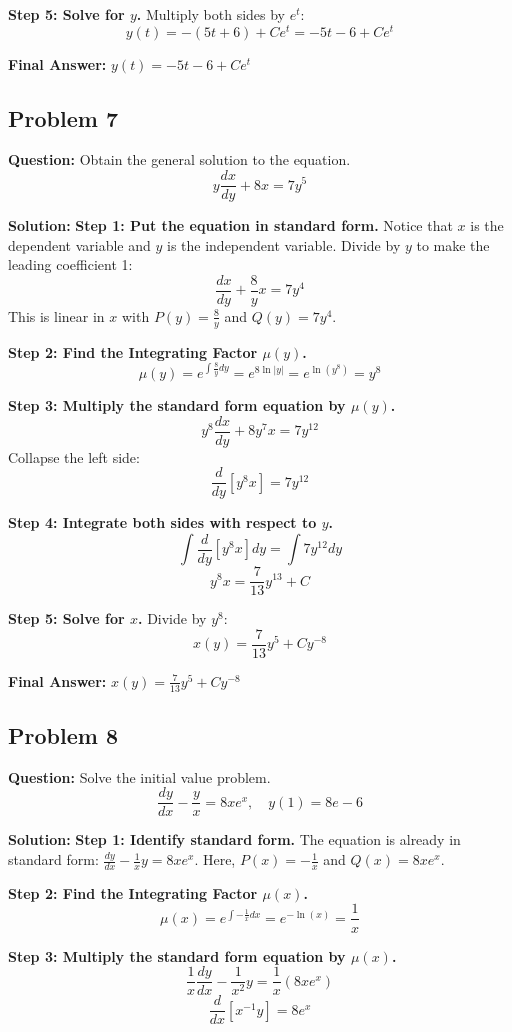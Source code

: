 \documentclass[11pt]{article}
\begin{document}
\textbf{Step 5: Solve for $y$.}
Multiply both sides by $e^t$:
\[ y(t) = - (5t + 6) + Ce^t = -5t - 6 + Ce^t \]

\textbf{Final Answer:} $y(t) = -5t - 6 + Ce^t$

\hrulefill

\subsection*{Problem 7}
\textbf{Question:} Obtain the general solution to the equation.
\[ y \frac{dx}{dy} + 8x = 7y^5 \]

\textbf{Solution:}
\textbf{Step 1: Put the equation in standard form.}
Notice that $x$ is the dependent variable and $y$ is the independent variable. Divide by $y$ to make the leading coefficient 1:
\[ \frac{dx}{dy} + \frac{8}{y} x = 7y^4 \]
This is linear in $x$ with $P(y) = \frac{8}{y}$ and $Q(y) = 7y^4$.

\textbf{Step 2: Find the Integrating Factor $\mu(y)$.}
\[ \mu(y) = e^{\int \frac{8}{y} dy} = e^{8\ln|y|} = e^{\ln(y^8)} = y^8 \]

\textbf{Step 3: Multiply the standard form equation by $\mu(y)$.}
\[ y^8 \frac{dx}{dy} + 8y^7 x = 7y^{12} \]
Collapse the left side:
\[ \frac{d}{dy} \left[ y^8 x \right] = 7y^{12} \]

\textbf{Step 4: Integrate both sides with respect to $y$.}
\[ \int \frac{d}{dy} \left[ y^8 x \right] dy = \int 7y^{12} dy \]
\[ y^8 x = \frac{7}{13}y^{13} + C \]

\textbf{Step 5: Solve for $x$.}
Divide by $y^8$:
\[ x(y) = \frac{7}{13}y^5 + Cy^{-8} \]

\textbf{Final Answer:} $x(y) = \frac{7}{13}y^5 + Cy^{-8}$

\hrulefill

\subsection*{Problem 8}
\textbf{Question:} Solve the initial value problem.
\[ \frac{dy}{dx} - \frac{y}{x} = 8xe^x, \quad y(1) = 8e - 6 \]

\textbf{Solution:}
\textbf{Step 1: Identify standard form.}
The equation is already in standard form: $\frac{dy}{dx} - \frac{1}{x}y = 8xe^x$.
Here, $P(x) = -\frac{1}{x}$ and $Q(x) = 8xe^x$.

\textbf{Step 2: Find the Integrating Factor $\mu(x)$.}
\[ \mu(x) = e^{\int -\frac{1}{x} dx} = e^{-\ln(x)} = \frac{1}{x} \]

\textbf{Step 3: Multiply the standard form equation by $\mu(x)$.}
\[ \frac{1}{x} \frac{dy}{dx} - \frac{1}{x^2}y = \frac{1}{x} (8xe^x) \]
\[ \frac{d}{dx} \left[ x^{-1} y \right] = 8e^x \]
\end{document}
